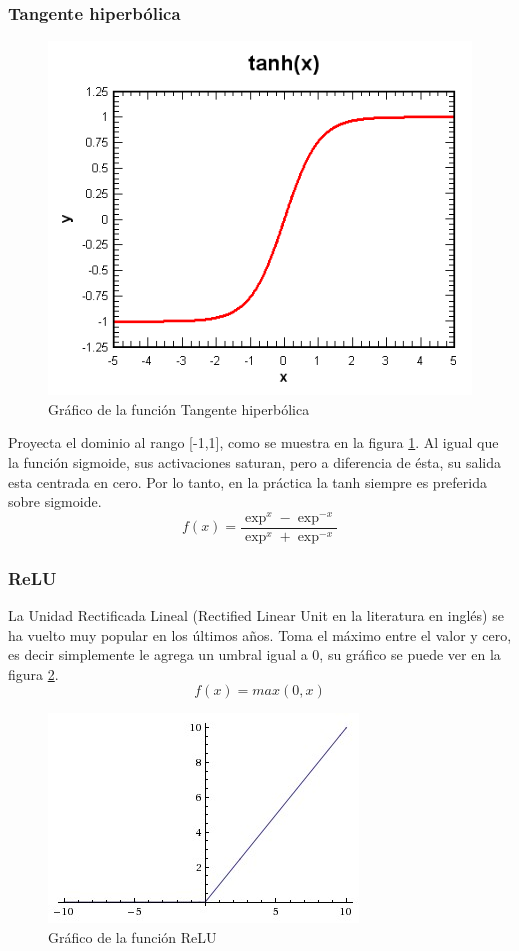 \documentclass[a4paper,11pt,spanish]{book}
\begin{document}
	  \subsubsection {Tangente hiperbólica}
	    \begin{figure}[ht]
	      \begin{center}
	       \includegraphics[width=0.4\linewidth]{./img/tanh.png}
	      \end{center}
	      \caption{Gráfico de la función Tangente hiperbólica}
	      \label{fig:tanh}
	    \end{figure}
	    Proyecta el dominio al rango [-1,1], como se muestra en la figura \ref{fig:tanh}. Al igual que la función sigmoide, sus activaciones saturan, pero a diferencia
	    de ésta, su salida esta centrada en cero. Por lo tanto, en la práctica la tanh siempre es preferida sobre sigmoide.
	    \begin{equation*}
	     f(x) = \frac{\exp^x - \exp^{-x}}{\exp^x + \exp^{-x}}
	    \end{equation*}

	  \subsubsection {ReLU} \label{sec:relu}
	    La Unidad Rectificada Lineal (Rectified Linear Unit en la literatura en inglés) se ha vuelto muy popular en los últimos años. 
	    Toma el máximo entre el valor y cero, es decir simplemente le agrega un umbral igual a 0, su gráfico se puede ver en la figura \ref{fig:relu}.
	    \begin{equation}
	     f(x) = max(0,x)
	    \end{equation}
	    \begin{figure}[ht]
	      \begin{center}
	       \includegraphics[width=0.4\linewidth]{./img/relu.jpeg}
	      \end{center}
	      \caption{Gráfico de la función ReLU}
	      \label{fig:relu}
	    \end{figure}
\end{document}
